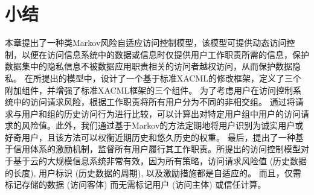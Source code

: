 \section{小结}
\label{sec:Conclusion}

本章提出了一种类Markov风险自适应访问控制模型，该模型可提供动态访问控制，以便在访问信息系统中的数据或信息时仅提供用户工作职责所需的信息，保护数据集中的隐私信息不被数据应用职责相关的访问者越权访问，从而保护数据隐私。 在所提出的模型中，设计了一个基于标准XACML的修改框架，定义了三个附加组件，并增强了标准XACML框架的三个组件。 为了考虑用户在访问控制系统中的访问请求风险，根据工作职责将所有用户分为不同的非相交组。 通过将请求与用户和组的历史访问行为进行比较，可以计算出对特定用户组中用户的访问请求的风险值。此外，我们通过基于Markov的方法定期地将用户识别为诚实用户或好奇用户，且该方法可以权衡近期历史和悠久历史的权重。 最后，提出了一种基于信用体系的激励机制，监督所有用户履行其工作职责。所提出的访问控制模型对于基于云的大规模信息系统非常有效，因为所有策略，访问请求风险值 (历史数据的长度), 用户标识 (历史数据的周期), 以及激励措施都是自适应的。  而且，仅需标记存储的数据 (访问客体) 而无需标记用户 (访问主体) 或信任计算。
